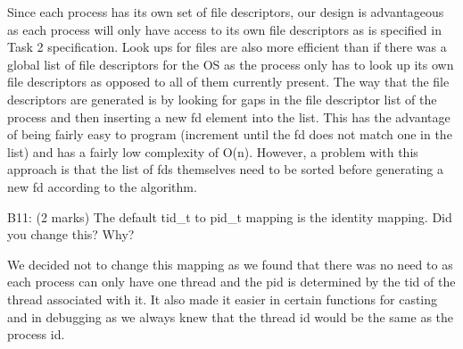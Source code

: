
Since each process has its own set of file descriptors, our design is advantageous as each process will only have access to its own file descriptors as is specified in Task 2 specification. Look ups for files are also more efficient than if there was a global list of file descriptors for the OS as the process only has to look up its own file descriptors as opposed to all of them currently present. The way that the file descriptors are generated is by looking for gaps in the file descriptor list of the process and then inserting a new fd element into the list. This has the advantage of being fairly easy to program (increment until the fd does not match one in the list) and has a fairly low complexity of O(n). However, a problem with this approach is that the list of fds themselves need to be sorted before generating a new fd according to the algorithm.


\noindent B11: (2 marks)
The default tid\_t to pid\_t mapping is the identity mapping.
Did you change this? Why?


We decided not to change this mapping as we found that there was no need to as each process can only have one thread and the pid is determined by the tid of the thread associated with it. It also made it easier in certain functions for casting and in debugging as we always knew that the thread id would be the same as the process id.
